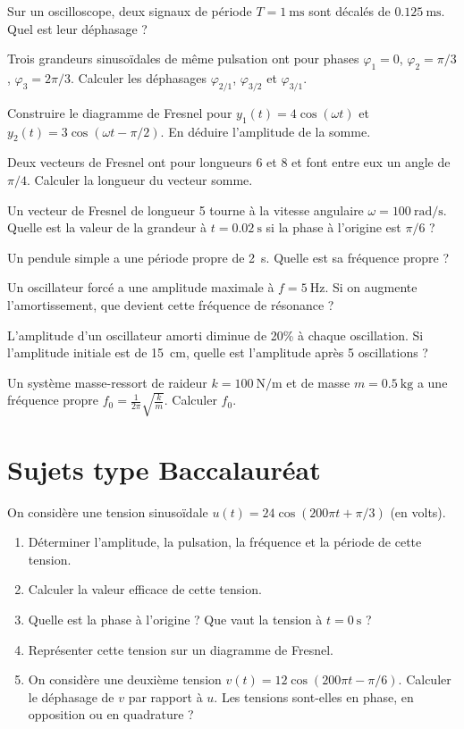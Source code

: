 \exo{} Sur un oscilloscope, deux signaux de période $T = \SI{1}{\milli\second}$ sont décalés de $\SI{0.125}{\milli\second}$. Quel est leur déphasage ?

\exo{} Trois grandeurs sinusoïdales de même pulsation ont pour phases $\varphi_1 = 0$, $\varphi_2 = \pi/3$, $\varphi_3 = 2\pi/3$. Calculer les déphasages $\varphi_{2/1}$, $\varphi_{3/2}$ et $\varphi_{3/1}$.


\exo{} Construire le diagramme de Fresnel pour $y_1(t) = 4\cos(\omega t)$ et $y_2(t) = 3\cos(\omega t - \pi/2)$. En déduire l'amplitude de la somme.

\exo{} Deux vecteurs de Fresnel ont pour longueurs 6 et 8 et font entre eux un angle de $\pi/4$. Calculer la longueur du vecteur somme.

\exo{} Un vecteur de Fresnel de longueur 5 tourne à la vitesse angulaire $\omega = \SI{100}{\radian\per\second}$. Quelle est la valeur de la grandeur à $t = \SI{0.02}{\second}$ si la phase à l'origine est $\pi/6$ ?


\exo{} Un pendule simple a une période propre de \SI{2}{\second}. Quelle est sa fréquence propre ?

\exo{} Un oscillateur forcé a une amplitude maximale à $f = \SI{5}{\hertz}$. Si on augmente l'amortissement, que devient cette fréquence de résonance ?

\exo{} L'amplitude d'un oscillateur amorti diminue de 20\% à chaque oscillation. Si l'amplitude initiale est de \SI{15}{\centi\metre}, quelle est l'amplitude après 5 oscillations ?

\exo{} Un système masse-ressort de raideur $k = \SI{100}{\newton\per\metre}$ et de masse $m = \SI{0.5}{\kilogram}$ a une fréquence propre $f_0 = \frac{1}{2\pi}\sqrt{\frac{k}{m}}$. Calculer $f_0$.

\section{Sujets type Baccalauréat}

On considère une tension sinusoïdale $u(t) = 24\cos(200\pi t + \pi/3)$ (en volts).

\begin{enumerate}
\item Déterminer l'amplitude, la pulsation, la fréquence et la période de cette tension.
\item Calculer la valeur efficace de cette tension.
\item Quelle est la phase à l'origine ? Que vaut la tension à $t = \SI{0}{\second}$ ?
\item Représenter cette tension sur un diagramme de Fresnel.
\item On considère une deuxième tension $v(t) = 12\cos(200\pi t - \pi/6)$. Calculer le déphasage de $v$ par rapport à $u$. Les tensions sont-elles en phase, en opposition ou en quadrature ?
\end{enumerate}

